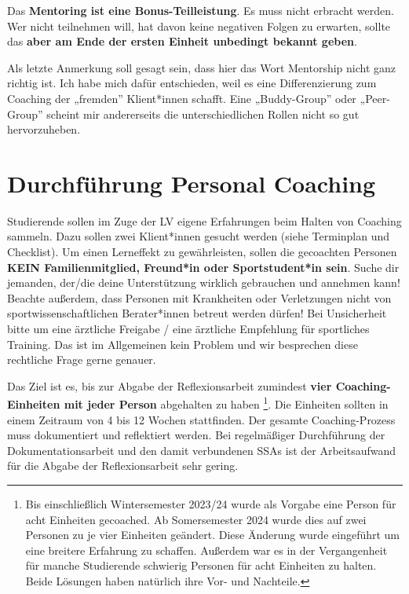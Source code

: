 \documentclass[
  letterpaper,
  DIV=11,
  numbers=noendperiod]{scrreprt}
\begin{document}
Das \textbf{Mentoring ist eine Bonus-Teilleistung}. Es muss nicht
erbracht werden. Wer nicht teilnehmen will, hat davon keine negativen
Folgen zu erwarten, sollte das \textbf{aber am Ende der ersten Einheit
unbedingt bekannt geben}.

Als letzte Anmerkung soll gesagt sein, dass hier das Wort Mentorship
nicht ganz richtig ist. Ich habe mich dafür entschieden, weil es eine
Differenzierung zum Coaching der „fremden'' Klient*innen schafft. Eine
„Buddy-Group'' oder „Peer-Group'' scheint mir andererseits die
unterschiedlichen Rollen nicht so gut hervorzuheben.

\section{Durchführung Personal
Coaching}\label{sec-durchfuxfchrung-personal-coaching}

Studierende sollen im Zuge der LV eigene Erfahrungen beim Halten von
Coaching sammeln. Dazu sollen zwei Klient*innen gesucht werden (siehe
Terminplan und Checklist). Um einen Lerneffekt zu gewährleisten, sollen
die gecoachten Personen \textbf{KEIN Familienmitglied, Freund*in oder
Sportstudent*in sein}. Suche dir jemanden, der/die deine Unterstützung
wirklich gebrauchen und annehmen kann! Beachte außerdem, dass Personen
mit Krankheiten oder Verletzungen nicht von sportwissenschaftlichen
Berater*innen betreut werden dürfen! Bei Unsicherheit bitte um eine
ärztliche Freigabe / eine ärztliche Empfehlung für sportliches Training.
Das ist im Allgemeinen kein Problem und wir besprechen diese rechtliche
Frage gerne genauer.

Das Ziel ist es, bis zur Abgabe der Reflexionsarbeit zumindest
\textbf{vier Coaching-Einheiten mit jeder Person} abgehalten zu haben
\footnote{Bis einschließlich Wintersemester 2023/24 wurde als Vorgabe
  eine Person für acht Einheiten gecoached. Ab Somersemester 2024 wurde
  dies auf zwei Personen zu je vier Einheiten geändert. Diese Änderung
  wurde eingeführt um eine breitere Erfahrung zu schaffen. Außerdem war
  es in der Vergangenheit für manche Studierende schwierig Personen für
  acht Einheiten zu halten. Beide Lösungen haben natürlich ihre Vor- und
  Nachteile.}. Die Einheiten sollten in einem Zeitraum von 4 bis 12
Wochen stattfinden. Der gesamte Coaching-Prozess muss dokumentiert und
reflektiert werden. Bei regelmäßiger Durchführung der
Dokumentationsarbeit und den damit verbundenen SSAs ist der
Arbeitsaufwand für die Abgabe der Reflexionsarbeit sehr gering.
\end{document}
